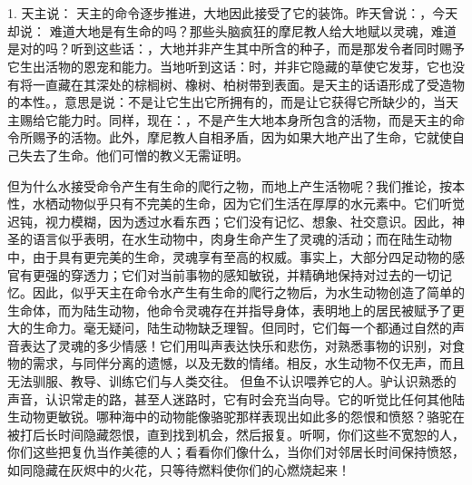 

\section{}

\par

1. 天主说：  天主的命令逐步推进，大地因此接受了它的装饰。昨天曾说：，今天却说： 难道大地是有生命的吗？那些头脑疯狂的摩尼教人给大地赋以灵魂，难道是对的吗？听到这些话：，大地并非产生其中所含的种子，而是那发令者同时赐予它生出活物的恩宠和能力。当地听到这话：时，并非它隐藏的草使它发芽，它也没有将一直藏在其深处的棕榈树、橡树、柏树带到表面。是天主的话语形成了受造物的本性。，意思是说：不是让它生出它所拥有的，而是让它获得它所缺少的，当天主赐给它能力时。同样，现在：，不是产生大地本身所包含的活物，而是天主的命令所赐予的活物。此外，摩尼教人自相矛盾，因为如果大地产出了生命，它就使自己失去了生命。他们可憎的教义无需证明。\par

但为什么水接受命令产生有生命的爬行之物，而地上产生活物呢？我们推论，按本性，水栖动物似乎只有不完美的生命，因为它们生活在厚厚的水元素中。它们听觉迟钝，视力模糊，因为透过水看东西；它们没有记忆、想象、社交意识。因此，神圣的语言似乎表明，在水生动物中，肉身生命产生了灵魂的活动；而在陆生动物中，由于具有更完美的生命，灵魂享有至高的权威。事实上，大部分四足动物的感官有更强的穿透力；它们对当前事物的感知敏锐，并精确地保持对过去的一切记忆。因此，似乎天主在命令水产生有生命的爬行之物后，为水生动物创造了简单的生命体，而为陆生动物，他命令灵魂存在并指导身体，表明地上的居民被赋予了更大的生命力。毫无疑问，陆生动物缺乏理智。但同时，它们每一个都通过自然的声音表达了灵魂的多少情感！它们用叫声表达快乐和悲伤，对熟悉事物的识别，对食物的需求，与同伴分离的遗憾，以及无数的情绪。相反，水生动物不仅无声，而且无法驯服、教导、训练它们与人类交往。  但鱼不认识喂养它的人。驴认识熟悉的声音，认识常走的路，甚至人迷路时，它有时会充当向导。它的听觉比任何其他陆生动物更敏锐。哪种海中的动物能像骆驼那样表现出如此多的怨恨和愤怒？骆驼在被打后长时间隐藏怨恨，直到找到机会，然后报复。听啊，你们这些不宽恕的人，你们这些把复仇当作美德的人；看看你们像什么，当你们对邻居长时间保持愤怒，如同隐藏在灰烬中的火花，只等待燃料使你们的心燃烧起来！\par

